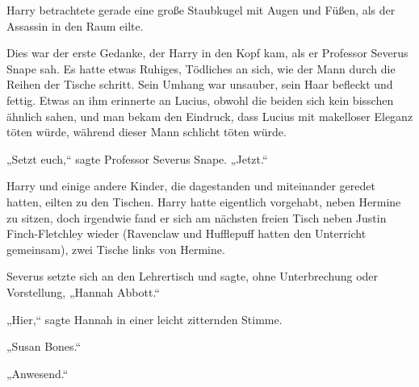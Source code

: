 Harry betrachtete gerade eine große Staubkugel mit Augen und Füßen, als der Assassin in den Raum eilte.

Dies war der erste Gedanke, der Harry in den Kopf kam, als er Professor Severus Snape sah. Es hatte etwas Ruhiges, Tödliches an sich, wie der Mann durch die Reihen der Tische schritt. Sein Umhang war unsauber, sein Haar befleckt und fettig. Etwas an ihm erinnerte an Lucius, obwohl die beiden sich kein bisschen ähnlich sahen, und man bekam den Eindruck, dass Lucius mit makelloser Eleganz töten würde, während dieser Mann schlicht töten würde.

„Setzt euch,“ sagte Professor Severus Snape. „Jetzt.“

Harry und einige andere Kinder, die dagestanden und miteinander geredet hatten, eilten zu den Tischen. Harry hatte eigentlich vorgehabt, neben Hermine zu sitzen, doch irgendwie fand er sich am nächsten freien Tisch neben Justin Finch-Fletchley wieder (Ravenclaw und Hufflepuff hatten den Unterricht gemeinsam), zwei Tische links von Hermine.

Severus setzte sich an den Lehrertisch und sagte, ohne Unterbrechung oder Vorstellung, „Hannah Abbott.“

„Hier,“ sagte Hannah in einer leicht zitternden Stimme.

„Susan Bones.“

„Anwesend.“

